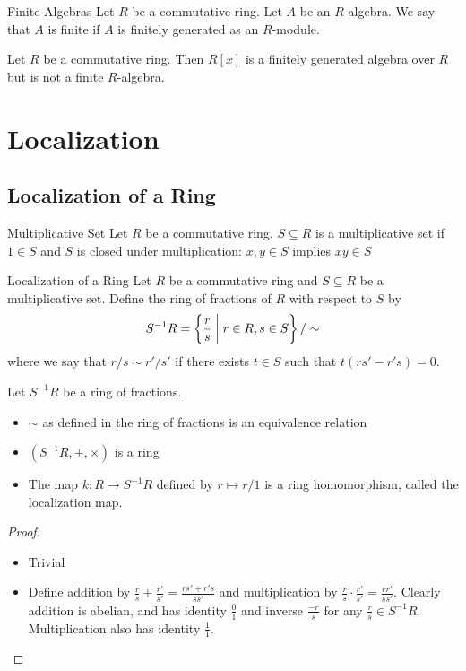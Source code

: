 \documentclass[a4paper]{article}
\begin{document}
\begin{defn}{Finite Algebras}{} Let $R$ be a commutative ring. Let $A$ be an $R$-algebra. We say that $A$ is finite if $A$ is finitely generated as an $R$-module. 
\end{defn}

\begin{eg}{}{} Let $R$ be a commutative ring. Then $R[x]$ is a finitely generated algebra over $R$ but is not a finite $R$-algebra. 
\end{eg}

\pagebreak
\section{Localization}
\subsection{Localization of a Ring}
\begin{defn}{Multiplicative Set}{} Let $R$ be a commutative ring. $S\subseteq R$ is a multiplicative set if $1\in S$ and $S$ is closed under multiplication: $x,y\in S$ implies $xy\in S$
\end{defn}

\begin{defn}{Localization of a Ring}{} Let $R$ be a commutative ring and $S\subseteq R$ be a multiplicative set. Define the ring of fractions of $R$ with respect to $S$ by $$S^{-1}R=\left\{\frac{r}{s}\;\bigg{|}\;r\in R,s\in S\right\}/\sim$$ where we say that $r/s\sim r'/s'$ if there exists $t\in S$ such that $t(rs'-r's)=0$. 
\end{defn}

\begin{prp}{}{} Let $S^{-1}R$ be a ring of fractions. 
\begin{itemize}
\item $\sim$ as defined in the ring of fractions is an equivalence relation
\item $(S^{-1}R,+,\times)$ is a ring
\item The map $k:R\to S^{-1}R$ defined by $r\mapsto r/1$ is a ring homomorphism, called the localization map. 
\end{itemize}\tcbline
\begin{proof}~\\
\begin{itemize}
\item Trivial
\item Define addition by $\frac{r}{s}+\frac{r'}{s'}=\frac{rs'+r's}{ss'}$ and multiplication by $\frac{r}{s}\cdot\frac{r'}{s'}=\frac{rr'}{ss'}$. Clearly addition is abelian, and has identity $\frac{0}{1}$ and inverse $\frac{-r}{s}$ for any $\frac{r}{s}\in S^{-1}R$. Multiplication also has identity $\frac{1}{1}$. 
\end{itemize}
\end{proof}
\end{prp}
\end{document}
